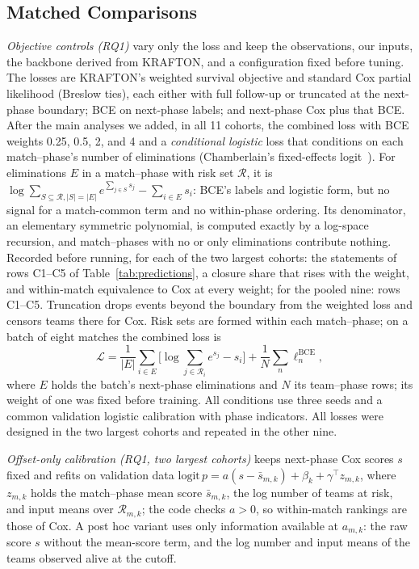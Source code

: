 \documentclass[sigconf,anonymous]{acmart}
\begin{document}
\subsection{Matched Comparisons}
\label{sec:method:decomposition}
\emph{Objective controls (RQ1)} vary only the loss and keep the observations, our inputs, the backbone derived from KRAFTON, and a configuration fixed before tuning. The losses are KRAFTON's weighted survival objective and standard Cox partial likelihood (Breslow ties), each either with full follow-up or truncated at the next-phase boundary; BCE on next-phase labels; and next-phase Cox plus that BCE. After the main analyses we added, in all 11 cohorts, the combined loss with BCE weights 0.25, 0.5, 2, and 4 and a \emph{conditional logistic} loss that conditions on each match--phase's number of eliminations (Chamberlain's fixed-effects logit~\cite{Chamberlain80}). For eliminations $E$ in a match--phase with risk set $\mathcal{R}$, it is $\log\sum_{S\subseteq\mathcal{R},|S|=|E|}e^{\sum_{j\in S}s_j}-\sum_{i\in E}s_i$: BCE's labels and logistic form, but no signal for a match-common term and no within-phase ordering. Its denominator, an elementary symmetric polynomial, is computed exactly by a log-space recursion, and match--phases with no or only eliminations contribute nothing. Recorded before running, for each of the two largest cohorts: the statements of rows C1--C5 of Table~\ref{tab:predictions}, a closure share that rises with the weight, and within-match equivalence to Cox at every weight; for the pooled nine: rows C1--C5. Truncation drops events beyond the boundary from the weighted loss and censors teams there for Cox. Risk sets are formed within each match--phase; on a batch of eight matches the combined loss is
\begin{equation}
\mathcal{L}=\frac{1}{|E|}\sum_{i\in E}\Big[\log\sum_{j\in\mathcal{R}_i}e^{s_j}-s_i\Big]+\frac{1}{N}\sum_{n}\ell^{\mathrm{BCE}}_n,
\label{eq:combined}
\end{equation}
where $E$ holds the batch's next-phase eliminations and $N$ its team--phase rows; its weight of one was fixed before training. All conditions use three seeds and a common validation logistic calibration with phase indicators. All losses were designed in the two largest cohorts and repeated in the other nine.

\emph{Offset-only calibration (RQ1, two largest cohorts)} keeps next-phase Cox scores $s$ fixed and refits on validation data $\mathrm{logit}\,p=a(s-\bar s_{m,k})+\beta_k+\gamma^{\top}z_{m,k}$, where $z_{m,k}$ holds the match--phase mean score $\bar s_{m,k}$, the log number of teams at risk, and input means over $\mathcal{R}_{m,k}$; the code checks $a>0$, so within-match rankings are those of Cox. A post hoc variant uses only information available at $a_{m,k}$: the raw score $s$ without the mean-score term, and the log number and input means of the teams observed alive at the cutoff.
\end{document}
